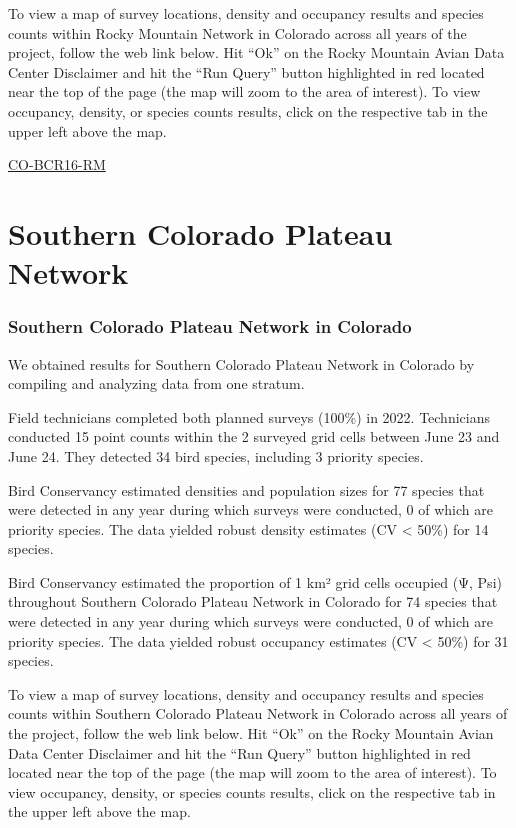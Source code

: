 \documentclass[
  letterpaper,
  DIV=11,
  numbers=noendperiod,
  oneside]{scrreprt}
\begin{document}
To view a map of survey locations, density and occupancy results and
species counts within Rocky Mountain Network in Colorado across all
years of the project, follow the web link below. Hit ``Ok'' on the Rocky
Mountain Avian Data Center Disclaimer and hit the ``Run Query'' button
highlighted in red located near the top of the page (the map will zoom
to the area of interest). To view occupancy, density, or species counts
results, click on the respective tab in the upper left above the map.

\href{http://www.rmbo.org/new_site/adc/QueryWindow.aspx\#N4IgzgLgTghhCuBbEAuABCAwgeQLQCFMAlARgDZciBZdAOTgEsB7AOxgBs0AFGKAazQBlAKZQAbgwDGwtLjREmkvgE80VJvBYQYDFmlrCIAdyb8QAXyA}{CO-BCR16-RM}

\hypertarget{southern-colorado-plateau-network}{%
\section{Southern Colorado Plateau
Network}\label{southern-colorado-plateau-network}}

\hypertarget{southern-colorado-plateau-network-in-colorado}{%
\subsubsection{Southern Colorado Plateau Network in
Colorado}\label{southern-colorado-plateau-network-in-colorado}}

We obtained results for Southern Colorado Plateau Network in Colorado by
compiling and analyzing data from one stratum.

Field technicians completed both planned surveys (100\%) in 2022.
Technicians conducted 15 point counts within the 2 surveyed grid cells
between June 23 and June 24. They detected 34 bird species, including 3
priority species.

Bird Conservancy estimated densities and population sizes for 77 species
that were detected in any year during which surveys were conducted, 0 of
which are priority species. The data yielded robust density estimates
(CV \textless{} 50\%) for 14 species.

Bird Conservancy estimated the proportion of 1 km² grid cells occupied
(Ψ, Psi) throughout Southern Colorado Plateau Network in Colorado for 74
species that were detected in any year during which surveys were
conducted, 0 of which are priority species. The data yielded robust
occupancy estimates (CV \textless{} 50\%) for 31 species.

To view a map of survey locations, density and occupancy results and
species counts within Southern Colorado Plateau Network in Colorado
across all years of the project, follow the web link below. Hit ``Ok''
on the Rocky Mountain Avian Data Center Disclaimer and hit the ``Run
Query'' button highlighted in red located near the top of the page (the
map will zoom to the area of interest). To view occupancy, density, or
species counts results, click on the respective tab in the upper left
above the map.
\end{document}

